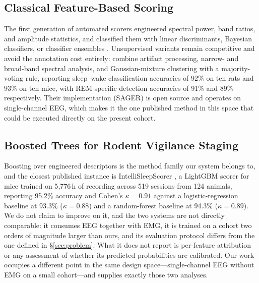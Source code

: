 \subsection{Classical Feature-Based Scoring}
The first generation of automated scorers engineered spectral power, band ratios, and amplitude statistics, and classified them with linear discriminants, Bayesian classifiers, or classifier ensembles \citep{gao2016_multi_cls}. Unsupervised variants remain competitive and avoid the annotation cost entirely: \citet{saevskiy2025_sensors} combine artifact processing, narrow- and broad-band spectral analysis, and Gaussian-mixture clustering with a majority-voting rule, reporting sleep--wake classification accuracies of 92\% on ten rats and 93\% on ten mice, with REM-specific detection accuracies of 91\% and 89\% respectively. Their implementation (SAGER) is open source and operates on single-channel EEG, which makes it the one published method in this space that could be executed directly on the present cohort.

\subsection{Boosted Trees for Rodent Vigilance Staging}
Boosting over engineered descriptors \citep{Chen_2016} is the method family our system belongs to, and the closest published instance is IntelliSleepScorer \citep{wang2023_intellisleepscorer}, a LightGBM scorer for mice trained on 5{,}776\,h of recording across 519 sessions from 124 animals, reporting 95.2\% accuracy and Cohen's $\kappa = 0.91$ against a logistic-regression baseline at 93.3\% ($\kappa = 0.88$) and a random-forest baseline at 94.3\% ($\kappa = 0.89$). We do not claim to improve on it, and the two systems are not directly comparable: it consumes EEG together with EMG, it is trained on a cohort two orders of magnitude larger than ours, and its evaluation protocol differs from the one defined in \S\ref{sec:problem}. What it does not report is per-feature attribution or any assessment of whether its predicted probabilities are calibrated. Our work occupies a different point in the same design space---single-channel EEG without EMG on a small cohort---and supplies exactly those two analyses.


